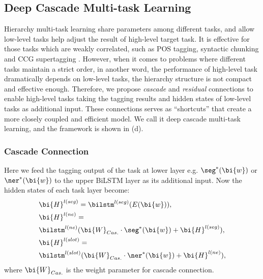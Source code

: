 \subsection{Deep Cascade Multi-task Learning}
\label{sec:dcmtl}
Hierarchy multi-task learning share parameters among different tasks,
and allow low-level tasks help adjust the result of high-level target task.
It is effective for those tasks which are weakly correlated,
such as POS tagging, syntactic chunking and CCG supertagging \cite{sogaard2016deep}.
However, when it comes to problems where different tasks maintain a 
strict order, in another word, the performance of high-level task 
dramatically depends on low-level tasks,
the hierarchy structure is not compact and effective enough.
Therefore, we propose \emph{cascade} and \emph{residual} connections
to enable high-level tasks taking the tagging results and hidden states 
of low-level tasks as additional input. 
These connections serves as ``shortcuts'' that 
create a more closely coupled and efficient model.
We call it deep cascade multi-task learning, 
and the framework is shown in (d).

\subsubsection{Cascade Connection}
Here we feed the tagging output of the task at lower layer 
e.g. $\seg^*(\bi{w})$ or $\ner^*(\bi{w})$
to the upper BiLSTM layer as its additional input.
Now the hidden states of each task layer become:
\begin{eqnarray*}
	& \bi{H}^{l(seg)}=\bilstm^{l(seg)}(E(\bi{w})), \\
	& \bi{H}^{l(ne)}= \\
	& \bilstm^{l(ne)}(\bi{W}_{Cas.}\cdot \seg^*(\bi{w})+\bi{H}^{l(seg)}), \\
	& \bi{H}^{l(slot)}= \\
	& \bilstm^{l(slot)}(\bi{W}_{Cas.}\cdot \ner^*(\bi{w})+\bi{H}^{l(ne)}),
\end{eqnarray*}
where $\bi{W}_{Cas.}$ is the weight parameter for cascade connection.

